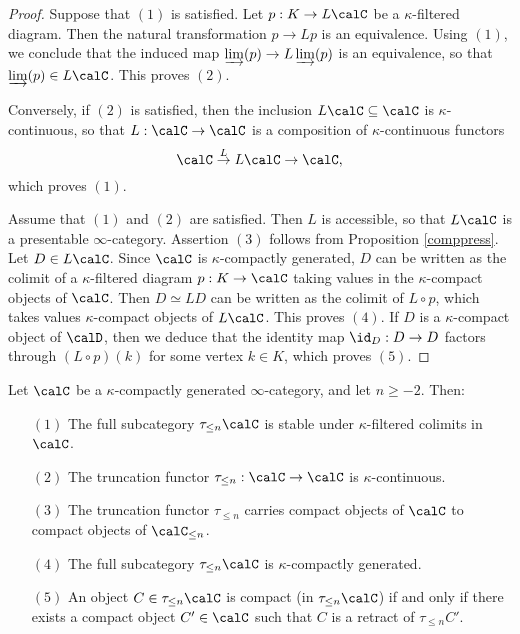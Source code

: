 \begin{proof}
Suppose that $(1)$ is satisfied. Let $p: K \rightarrow L \calC$ be a $\kappa$-filtered diagram. Then the natural transformation $p \rightarrow Lp$ is an equivalence. Using $(1)$, we conclude that
the induced map $\varinjlim(p) \rightarrow L \varinjlim(p)$ is an equivalence, so that
$\varinjlim(p) \in L \calC$. This proves $(2)$.

Conversely, if $(2)$ is satisfied, then the inclusion $L \calC \subseteq \calC$ is $\kappa$-continuous, so that $L: \calC \rightarrow \calC$ is a composition of $\kappa$-continuous functors
$$ \calC \stackrel{L}{\rightarrow} L \calC \rightarrow \calC,$$
which proves $(1)$.

Assume that $(1)$ and $(2)$ are satisfied. Then $L$ is accessible, so that
$L \calC$ is a presentable $\infty$-category. 
Assertion $(3)$ follows from Proposition \ref{comppress}.
Let $D \in L \calC$. Since $\calC$ is $\kappa$-compactly generated, 
$D$ can be written as the colimit of a $\kappa$-filtered diagram $p: K \rightarrow \calC$ taking values in the $\kappa$-compact objects of $\calC$. Then $D \simeq LD$ can be written
as the colimit of $L \circ p$, which takes values $\kappa$-compact objects of $L \calC$. This proves $(4)$. If $D$ is a $\kappa$-compact object of $\calD$, then we deduce that the identity map
$\id_{D}: D \rightarrow D$ factors through $(L \circ p)(k)$ for some vertex $k \in K$, which proves $(5)$.
\end{proof}

\begin{corollary}\label{hunterygreen}
Let $\calC$ be a $\kappa$-compactly generated $\infty$-category, and let
$n \geq -2$. Then:
\begin{itemize}
\item[$(1)$] The full subcategory $\tau_{\leq n} \calC$ is stable under $\kappa$-filtered colimits in $\calC$.
\item[$(2)$] The truncation functor $\tau_{\leq n}: \calC \rightarrow \calC$ is $\kappa$-continuous.
\item[$(3)$] The truncation functor $\tau_{\leq n}$ carries compact objects of $\calC$ to compact objects of $\calC_{\leq n}$. 
\item[$(4)$] The full subcategory $\tau_{\leq n} \calC$ is $\kappa$-compactly generated.
\item[$(5)$] An object $C \in \tau_{\leq n} \calC$ is compact (in $\tau_{ \leq n} \calC$) if and only if there exists a compact object $C' \in \calC$ such that $C$ is a retract of $\tau_{\leq n} C'$.
\end{itemize}
\end{corollary}

